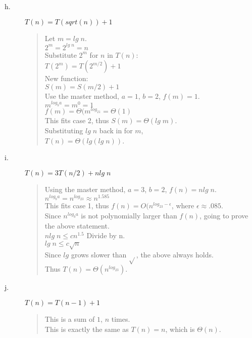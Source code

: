 \documentclass{article}
\begin{document}
\begin{description}
\item[h.]$T(n) = T(sqrt(n)) + 1$
\begin{quote}
\textsf{Let $m = lg\; n$.\\
$2^m = 2^{lg\; n} = n$\\
Substitute $2^m$ for $n$ in $T(n)$:\\
$T(2^m) = T(2^{m/2}) + 1$\\
New function:\\
$S(m) = S(m/2) + 1$\\
Use the master method, $a = 1$, $b = 2$, $f(m) = 1$.\\
$m^{log_ba} = m^0 = 1$\\
$f(m) = \Theta(m^{log_21} = \Theta(1)$\\
This fits case 2, thus $S(m) = \Theta(lg\; m)$.\\
Substituting $lg\; n$ back in for $m$,\\
$T(n) = \Theta(lg(lg\; n))$.}
\end{quote}

\item[i.]$T(n) = 3T(n/2) + nlg\; n$
\begin{quote}
\textsf{Using the master method, $a = 3$, $b = 2$, $f(n) = nlg\; n$.\\
$n^{log_ba} = n^{log_23} \approx n^{1.585}$\\
This fits case 1, thus $f(n) = O(n^{log_23 - \epsilon}$, where $\epsilon \approx .085$.\\
Since $n^{log_ba}$ is not polynomially larger than $f(n)$, going to prove the above statement.\\
$nlg\; n \leq cn^{1.5}$
Divide by n.\\
$lg\; n \leq c\sqrt{n}$\\
Since $lg$ grows slower than $\sqrt{}$, the above always holds.\\
Thus $T(n) = \Theta(n^{log_23})$.}
\end{quote}

\item[j.]$T(n) = T(n-1) + 1$
\begin{quote}
\textsf{This is a sum of $1$, $n$ times.\\
This is exactly the same as $T(n) = n$, which is $\Theta(n)$.}
\end{quote}

\end{description}
\end{document}

